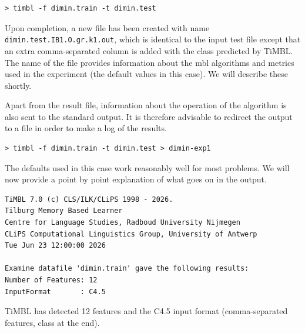 \documentclass{book}
\begin{document}
{\footnotesize
\begin{verbatim}
> timbl -f dimin.train -t dimin.test
\end{verbatim}
}

Upon completion, a new file has been created with name {\small\tt
dimin.test.IB1.O.gr.k1.out}, which is identical to the
input test file except that an extra comma-separated column is added
with the class predicted by TiMBL. The name of the file provides
information about the {\sc mbl} algorithms and metrics used in the
experiment (the default values in this case). We will describe these
shortly.

Apart from the result file, information about the operation of the
algorithm is also sent to the standard output. It is therefore
advisable to redirect the output to a file in order to make a log of
the results.

{\footnotesize
\begin{verbatim}
> timbl -f dimin.train -t dimin.test > dimin-exp1
\end{verbatim}
}

The defaults used in this case work reasonably well for most problems.  We
will now provide a point by point explanation of what goes on in the
output.



{\footnotesize
\begin{verbatim}
TiMBL 7.0 (c) CLS/ILK/CLiPS 1998 - 2026.
Tilburg Memory Based Learner
Centre for Language Studies, Radboud University Nijmegen
CLiPS Computational Linguistics Group, University of Antwerp
Tue Jun 23 12:00:00 2026

Examine datafile 'dimin.train' gave the following results:
Number of Features: 12
InputFormat       : C4.5
\end{verbatim}
}



TiMBL has detected 12 features and the C4.5 input format
(comma-separated features, class at the end).

\end{document}
